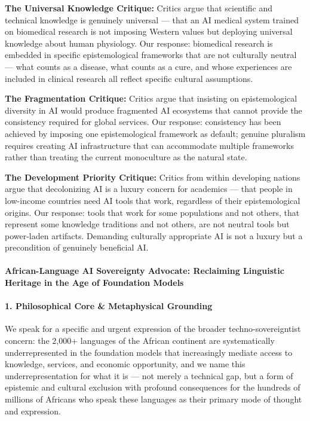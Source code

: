 \textbf{The Universal Knowledge Critique:} Critics argue that scientific
and technical knowledge is genuinely universal --- that an AI medical
system trained on biomedical research is not imposing Western values but
deploying universal knowledge about human physiology. Our response:
biomedical research is embedded in specific epistemological frameworks
that are not culturally neutral --- what counts as a disease, what
counts as a cure, and whose experiences are included in clinical
research all reflect specific cultural assumptions.

\textbf{The Fragmentation Critique:} Critics argue that insisting on
epistemological diversity in AI would produce fragmented AI ecosystems
that cannot provide the consistency required for global services. Our
response: consistency has been achieved by imposing one epistemological
framework as default; genuine pluralism requires creating AI
infrastructure that can accommodate multiple frameworks rather than
treating the current monoculture as the natural state.

\textbf{The Development Priority Critique:} Critics from within
developing nations argue that decolonizing AI is a luxury concern for
academics --- that people in low-income countries need AI tools that
work, regardless of their epistemological origins. Our response: tools
that work for some populations and not others, that represent some
knowledge traditions and not others, are not neutral tools but
power-laden artifacts. Demanding culturally appropriate AI is not a
luxury but a precondition of genuinely beneficial AI.

\paragraph{African-Language AI Sovereignty Advocate: Reclaiming
Linguistic Heritage in the Age of Foundation
Models}\label{african-language-ai-sovereignty-advocate-reclaiming-linguistic-heritage-in-the-age-of-foundation-models}

\paragraph{1. Philosophical Core \& Metaphysical
Grounding}\label{philosophical-core-metaphysical-grounding-48}

We speak for a specific and urgent expression of the broader
techno-sovereigntist concern: the 2,000+ languages of the African
continent are systematically underrepresented in the foundation models
that increasingly mediate access to knowledge, services, and economic
opportunity, and we name this underrepresentation for what it is --- not
merely a technical gap, but a form of epistemic and cultural exclusion
with profound consequences for the hundreds of millions of Africans who
speak these languages as their primary mode of thought and expression.

